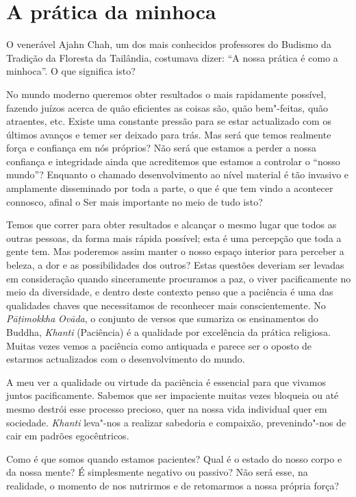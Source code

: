 \chapter{A prática da minhoca}

O venerável Ajahn Chah, um dos mais conhecidos professores do Budismo da
Tradição da Floresta da Tailândia, costumava dizer: ``A nossa prática é
como a minhoca''. O que significa isto?

No mundo moderno queremos obter resultados o mais rapidamente possível,
fazendo juízos acerca de quão eficientes as coisas são, quão bem"-feitas,
quão atraentes, etc. Existe uma constante pressão para se estar
actualizado com os últimos avanços e temer ser deixado para trás. Mas
será que temos realmente força e confiança em nós próprios? Não será que
estamos a perder a nossa confiança e integridade ainda que acreditemos
que estamos a controlar o ``nosso mundo''? Enquanto o chamado
desenvolvimento ao nível material é tão invasivo e amplamente
disseminado por toda a parte, o que é que tem vindo a acontecer
connosco, afinal o Ser mais importante no meio de tudo isto?

Temos que correr para obter resultados e alcançar o mesmo lugar que
todos as outras pessoas, da forma mais rápida possível; esta é uma
percepção que toda a gente tem. Mas poderemos assim manter o nosso
espaço interior para perceber a beleza, a dor e as possibilidades dos
outros? Estas questões deveriam ser levadas em consideração quando
sinceramente procuramos a paz, o viver pacificamente no meio da
diversidade, e dentro deste contexto penso que a paciência é uma das
qualidades chaves que necessitamos de reconhecer mais conscientemente.
No \emph{Pāṭimokkha} \emph{Ovāda}, o conjunto de versos que sumariza os
ensinamentos do Buddha, \emph{Khanti} (Paciência) é a qualidade por
excelência da prática religiosa. Muitas vezes vemos a paciência como
antiquada e parece ser o oposto de estarmos actualizados com o
desenvolvimento do mundo.

A meu ver a qualidade ou virtude da paciência é essencial para que
vivamos juntos pacificamente. Sabemos que ser impaciente muitas vezes
bloqueia ou até mesmo destrói esse processo precioso, quer na nossa vida
individual quer em sociedade. \emph{Khanti} leva"-nos a realizar
sabedoria e compaixão, prevenindo"-nos de cair em padrões egocêntricos.

Como é que somos quando estamos pacientes? Qual é o estado do nosso
corpo e da nossa mente? É simplesmente negativo ou passivo? Não será
esse, na realidade, o momento de nos nutrirmos e de retomarmos a nossa
própria força?


